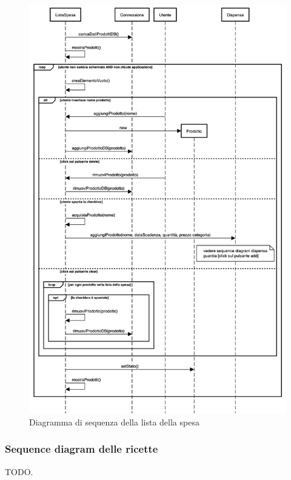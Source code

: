 \documentclass{article}
\begin{document}
\begin{figure}[H]
    \includegraphics[width=\linewidth]{images/sequence-shopping-list.png}
    \caption{Diagramma di sequenza della lista della spesa}
    \label{fig:seqshoplist}
\end{figure}

\subsubsection{Sequence diagram delle ricette}

TODO.
\end{document}
